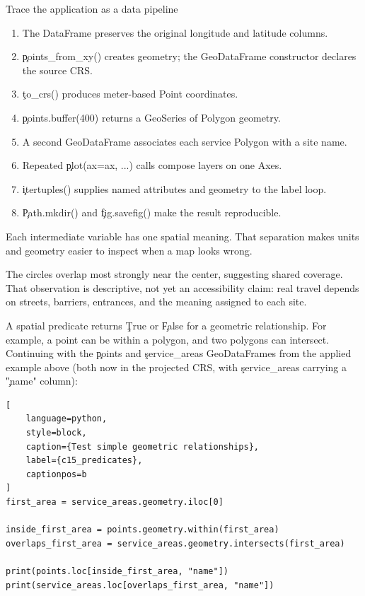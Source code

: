 \begin{SyntaxBox}{Trace the application as a data pipeline}
\begin{enumerate}
    \item The DataFrame preserves the original longitude and latitude columns.
    \item \c{points_from_xy()} creates geometry; the GeoDataFrame constructor
          declares the source CRS.
    \item \c{to_crs()} produces meter-based Point coordinates.
    \item \c{points.buffer(400)} returns a GeoSeries of Polygon geometry.
    \item A second GeoDataFrame associates each service Polygon with a site name.
    \item Repeated \c{plot(ax=ax, ...)} calls compose layers on one Axes.
    \item \c{itertuples()} supplies named attributes and geometry to the label loop.
    \item \c{Path.mkdir()} and \c{fig.savefig()} make the result reproducible.
\end{enumerate}
Each intermediate variable has one spatial meaning. That separation makes
units and geometry easier to inspect when a map looks wrong.
\end{SyntaxBox}

The circles overlap most strongly near the center, suggesting shared coverage.
That observation is descriptive, not yet an accessibility claim: real travel
depends on streets, barriers, entrances, and the meaning assigned to each site.


A spatial predicate returns \c{True} or \c{False} for a geometric relationship.
For example, a point can be within a polygon, and two polygons can intersect.
Continuing with the \c{points} and \c{service_areas} GeoDataFrames from the
applied example above (both now in the projected CRS, with
\c{service_areas} carrying a \c{"name"} column):

\begin{lstlisting}[
    language=python,
    style=block,
    caption={Test simple geometric relationships},
    label={c15_predicates},
    captionpos=b
]
first_area = service_areas.geometry.iloc[0]

inside_first_area = points.geometry.within(first_area)
overlaps_first_area = service_areas.geometry.intersects(first_area)

print(points.loc[inside_first_area, "name"])
print(service_areas.loc[overlaps_first_area, "name"])
\end{lstlisting}

